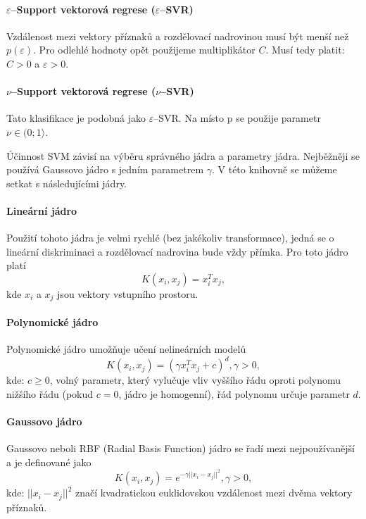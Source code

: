 \paragraph*{$\varepsilon$--Support vektorová regrese ($\varepsilon$--SVR)} 
Vzdálenost mezi vektory příznaků a rozdělovací nadrovinou musí být menší než $p (\varepsilon)$. Pro odlehlé hodnoty opět použijeme multiplikátor $C$. Musí tedy platit: $C > 0$ a $\varepsilon > 0$. \cite{svrsvm}

\paragraph*{$\nu$--Support vektorová regrese ($\nu$--SVR)} 
Tato klasifikace je podobná jako $\varepsilon$--SVR. Na místo p se použije parametr $\nu \in (0;1\rangle$. \cite{nusvmsvrclass}

Účinnost SVM závisí na výběru správného jádra a parametry jádra. Nejběžněji se používá Gaussovo jádro s jedním parametrem $\gamma$. V této knihovně se můžeme setkat s následujícími jádry.

\paragraph*{Lineární jádro} 
Použití tohoto jádra je velmi rychlé (bez jakékoliv transformace), jedná se o lineární diskriminaci a rozdělovací nadrovina bude vždy přímka. Pro toto jádro platí 
\begin{equation*}
 \label{linearK}
  K(x_i, x_j) = x_i^T x_j,
\end{equation*}
  kde $x_i$ a $x_j$ jsou vektory vstupního prostoru.

\paragraph*{Polynomické jádro} 
Polynomické jádro umožňuje učení nelineárních modelů
\begin{equation*}
\label{polyK}
  K(x_i, x_j) = (\gamma x_i^T x_j + c)^{d}, \gamma > 0,
\end{equation*}
kde: $c \geq 0$, volný parametr, který vylučuje vliv vyššího řádu oproti polynomu nižšího řádu (pokud $c = 0$, jádro je homogenní), řád polynomu určuje parametr $d$.

\paragraph*{Gaussovo jádro} 
Gaussovo neboli RBF (Radial Basis Function) jádro se řadí mezi nejpoužívanější a je definované jako
\begin{equation*}
\label{RBFK}
 K(x_i, x_j) = e^{-\gamma ||x_i - x_j||^2}, \gamma > 0,
\end{equation*}
kde: $||x_i - x_j||^2$ značí kvadratickou euklidovskou vzdálenost mezi dvěma vektory příznaků.

